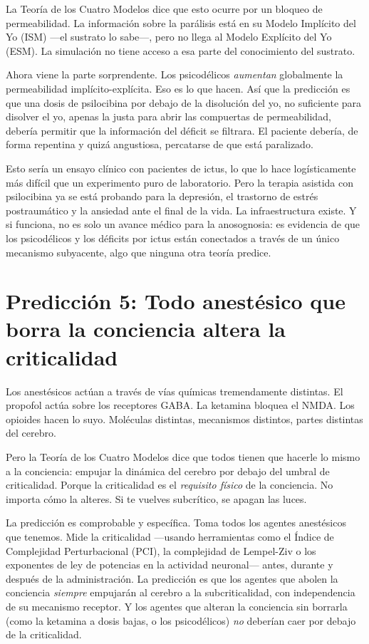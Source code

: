 \documentclass[11pt, twoside, openright]{book}
\begin{document}
La Teoría de los Cuatro Modelos dice que esto ocurre por un bloqueo de permeabilidad. La información sobre la parálisis está en su Modelo Implícito del Yo (ISM) ---el sustrato lo sabe---, pero no llega al Modelo Explícito del Yo (ESM). La simulación no tiene acceso a esa parte del conocimiento del sustrato.

Ahora viene la parte sorprendente. Los psicodélicos \textit{aumentan} globalmente la permeabilidad implícito-explícita. Eso es lo que hacen. Así que la predicción es que una dosis de psilocibina por debajo de la disolución del yo, no suficiente para disolver el yo, apenas la justa para abrir las compuertas de permeabilidad, debería permitir que la información del déficit se filtrara. El paciente debería, de forma repentina y quizá angustiosa, percatarse de que está paralizado.

Esto sería un ensayo clínico con pacientes de ictus, lo que lo hace logísticamente más difícil que un experimento puro de laboratorio. Pero la terapia asistida con psilocibina ya se está probando para la depresión, el trastorno de estrés postraumático y la ansiedad ante el final de la vida. La infraestructura existe. Y si funciona, no es solo un avance médico para la anosognosia: es evidencia de que los psicodélicos y los déficits por ictus están conectados a través de un único mecanismo subyacente, algo que ninguna otra teoría predice.

\section*{Predicción 5: Todo anestésico que borra la conciencia altera la criticalidad}

Los anestésicos actúan a través de vías químicas tremendamente distintas. El propofol actúa sobre los receptores GABA. La ketamina bloquea el NMDA. Los opioides hacen lo suyo. Moléculas distintas, mecanismos distintos, partes distintas del cerebro.

Pero la Teoría de los Cuatro Modelos dice que todos tienen que hacerle lo mismo a la conciencia: empujar la dinámica del cerebro por debajo del umbral de criticalidad. Porque la criticalidad es el \textit{requisito físico} de la conciencia. No importa cómo la alteres. Si te vuelves subcrítico, se apagan las luces.

La predicción es comprobable y específica. Toma todos los agentes anestésicos que tenemos. Mide la criticalidad ---usando herramientas como el Índice de Complejidad Perturbacional (PCI), la complejidad de Lempel-Ziv o los exponentes de ley de potencias en la actividad neuronal--- antes, durante y después de la administración. La predicción es que los agentes que abolen la conciencia \textit{siempre} empujarán al cerebro a la subcriticalidad, con independencia de su mecanismo receptor. Y los agentes que alteran la conciencia sin borrarla (como la ketamina a dosis bajas, o los psicodélicos) \textit{no} deberían caer por debajo de la criticalidad.
\end{document}
